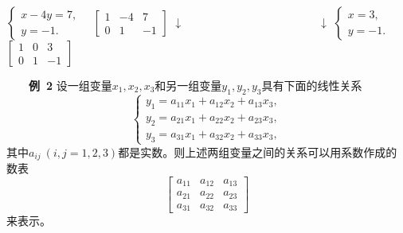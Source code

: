 \documentclass[compress,mathserif,cjk]{beamer}
\theoremstyle{remark}
\numberwithin{equation}{section}
\newcommand{\hei}{\bf}      %
\begin{document}
\begin{CJK}{UTF8}{gbsn}
\begin{frame}
 \vskip 2pt\hspace{4.4em}
 $\left\{\begin{array}{r}x-4y=7,\ \ \ \\ y=-1.\end{array}\right.$ \hspace{5.3em}$\left[\begin{matrix}1&-4&7\\ 0&1&-1\end{matrix}\right]$
 \vskip 2pt\hspace{8em}$\downarrow\hspace{12em}\downarrow$
 \vskip 2pt\hspace{4.4em}
 $\left\{\begin{array}{r}x=3,\ \ \ \\ y=-1.\end{array}\right.$ \hspace{7.5em}$\left[\begin{matrix}1&0&3\\ 0&1&-1\end{matrix}\right]$
\end{frame}

\begin{frame}
 \ \ \ \ {\hei 例~2} 设一组变量$x_1,x_2,x_3$和另一组变量$y_1,y_2,y_3$具有下面的线性关系
 $$\left\{\begin{array}{r}
 y_1=a_{11}x_1+a_{12}x_2+a_{13}x_3,\\
 y_2=a_{21}x_1+a_{22}x_2+a_{23}x_3,\\
 y_3=a_{31}x_1+a_{32}x_2+a_{33}x_3,
 \end{array}\right.$$
 其中$a_{ij}~(i,j=1,2,3)$都是实数。\pause 则上述两组变量之间的关系可以用系数作成的数表
 $$\left[\begin{matrix}a_{11}&a_{12}&a_{13}\\a_{21}&a_{22}&a_{23}\\a_{31}&a_{32}&a_{33}\end{matrix}\right]$$
 来表示。
\end{frame}


\end{CJK}
\end{document}
